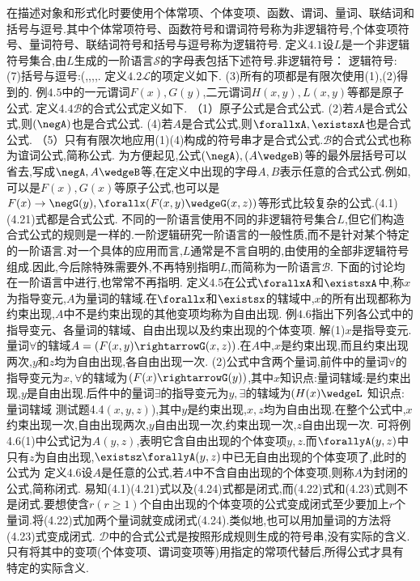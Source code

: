 {在描述对象和形式化时要使用个体常项、个体变项、函数、谓词、量词、联结词和括号与逗号.其中个体常项符号、函数符号和谓词符号称为非逻辑符号,个体变项符号、量词符号、联结词符号和括号与逗号称为逻辑符号.
定义$4.1$设$L$是一个非逻辑符号集合,由$L$生成的一阶语言$\mathscr{S}$的字母表包括下述符号.非逻辑符号：
逻辑符号:
(7)括号与逗号:(,,,,.
定义$4.2\mathscr{L}$的项定义如下.
(3)所有的项都是有限次使用(1),(2)得到的.
例$4.5$中的一元谓词$F(x),G(y)$,二元谓词$H(x,y),L(x,y)$等都是原子公式.
定义$4.4\mathscr{B}$的合式公式定义如下.
（1）原子公式是合式公式.
(2)若$A$是合式公式,则$(\negA)$也是合式公式.
(4)若$A$是合式公式,则$\forallxA,\existsxA$也是合式公式.
（5）只有有限次地应用(1)(4)构成的符号串才是合式公式.$\mathscr{B}$的合式公式也称为谊词公式,简称公式.
为方便起见,公式$(\negA),(A\wedgeB)$等的最外层括号可以省去,写成$\negA,A\wedgeB$等,在定义中出现的字母$A,B$表示任意的合式公式.例如,可以是$F(x),G(x)$等原子公式,也可以是$F(x)\rightarrow\negG(y),\forallx(F(x,y)\wedgeG(x,z))$等形式比较复杂的公式.(4.1)(4.21)式都是合式公式.
不同的一阶语言使用不同的非逻辑符号集合$L$,但它们构造合式公式的规则是一样的.一阶逻辑研究一阶语言的一般性质,而不是针对某个特定的一阶语言.对一个具体的应用而言,$L$通常是不言自明的,由使用的全部非逻辑符号组成.因此,今后除特殊需要外,不再特别指明$L$,而简称为一阶语言$\mathscr{B}$.
下面的讨论均在一阶语言中进行,也常常不再指明.
定义$4.5$在公式$\forallxA$和$\existsxA$中,称$x$为指导变元,$A$为量词的辖域.在$\forallx$和$\existsx$的辖域中,$x$的所有出现都称为约束出现,$A$中不是约束出现的其他变项均称为自由出现.
例$4.6$指出下列各公式中的指导变元、各量词的辖域、自由出现以及约束出现的个体变项.
解(1)$x$是指导变元.量词$\forall$的辖域$A=(F(x,y)\rightarrowG(x,z))$.在$A$中,$x$是约束出现,而且约束出现两次,$y$和$z$均为自由出现,各自由出现一次.
(2)公式中含两个量词,前件中的量词$\forall$的指导变元为$x,\forall$的辖域为$(F(x)\rightarrowG(y))$,其中$x$知识点:量词辖域:是约束出现,$y$是自由出现.后件中的量词$\exists$的指导变元为$y,\exists$的辖域为$(H(x)\wedgeL$
知识点:量词辖域
测试题4.4$(x,y,z)$),其中$y$是约束出现,$x,z$均为自由出现.在整个公式中,$x$约束出现一次,自由出现两次,$y$自由出现一次,约束出现一次,$z$自由出现一次.
可将例4.6(1)中公式记为$A(y,z)$,表明它含自由出现的个体变项$y,z$.而$\forallyA(y,z)$中只有$z$为自由出现,$\existsz\forallyA(y,z)$中已无自由出现的个体变项了,此时的公式为
定义$4.6$设$A$是任意的公式,若$A$中不含自由出现的个体变项,则称$A$为封闭的公式,简称闭式.
易知(4.1)(4.21)式以及(4.24)式都是闭式,而(4.22)式和(4.23)式则不是闭式.要想使含$r(r\geqslant1)$个自由出现的个体变项的公式变成闭式至少要加上$r$个量词.将(4.22)式加两个量词就变成闭式(4.24).类似地,也可以用加量词的方法将(4.23)式变成闭式.
$\mathscr{D}$中的合式公式是按照形成规则生成的符号串,没有实际的含义.只有将其中的变项(个体变项、谓词变项等)用指定的常项代替后,所得公式才具有特定的实际含义.
}
